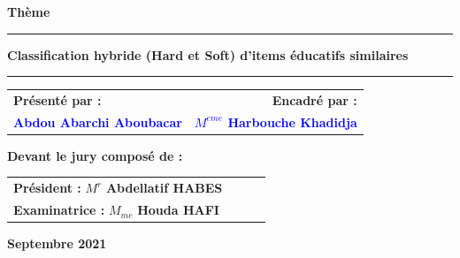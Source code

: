 {\begin{titlepage}
\begin{center}
\vspace{1cm}
\Huge\textbf{Thème}
\noindent\rule{\textwidth}{0.9mm}
\Large{\textbf{Classification hybride (Hard et Soft) d'items éducatifs similaires}}
\noindent\rule{\textwidth}{0.9mm}
\end{center}
\vspace{1.5cm}
\begin{tabular}{l r}
\hspace{1cm}\textbf{Présenté par :}&\hspace{5cm}\textbf{Encadré par :}\\
\hspace{1cm}\textbf{\textcolor{blue}{Abdou Abarchi Aboubacar}}&\textbf{\textcolor{blue}{$M^{eme}$ Harbouche Khadidja}}\\
\end{tabular}
\begin{center}
\vspace{1.5cm}
\hspace{0.3cm}\textbf{\large{Devant le jury composé de : }}\\
\vspace{0.5cm}
\begin{tabular}{llll}
\hspace{0.3cm}\textbf{\textbf{ Président : }} \hspace{0.8cm} $M^{r}$ \textbf{Abdellatif  HABES} \\
\vspace{0.1cm}
\hspace{0.3cm}\textbf{\textbf{Examinatrice : }} \hspace{0.2cm} $M_{me}$ \textbf{Houda  HAFI}
\end{tabular}
\end{center}
\vspace{2cm}
\begin{center}
\textbf{Septembre 2021}
\end{center}

\end{titlepage}
\restoregeometry  
\nopagebreak
}

